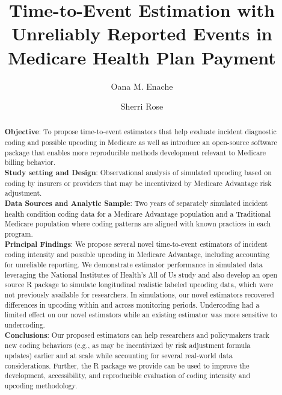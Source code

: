 \documentclass[
  12pt,
  number]{elsarticle}
\begin{document}
\begin{frontmatter}
\title{Time-to-Event Estimation with Unreliably Reported Events in
Medicare Health Plan Payment}
\author[1]{Oana M. Enache%
%
}
\author[2]{Sherri Rose%
%
}





        
\begin{abstract}
\textbf{Objective}: To propose time-to-event estimators that help
evaluate incident diagnostic coding and possible upcoding in Medicare as
well as introduce an open-source software package that enables more
reproducible methods development relevant to Medicare billing
behavior.\\
\textbf{Study setting and Design}: Observational analysis of simulated
upcoding based on coding by insurers or providers that may be
incentivized by Medicare Advantage risk adjustment.\\
\textbf{Data Sources and Analytic Sample}: Two years of separately
simulated incident health condition coding data for a Medicare Advantage
population and a Traditional Medicare population where coding patterns
are aligned with known practices in each program.\\
\textbf{Principal Findings}: We propose several novel time-to-event
estimators of incident coding intensity and possible upcoding in
Medicare Advantage, including accounting for unreliable reporting. We
demonstrate estimator performance in simulated data leveraging the
National Institutes of Health's All of Us study and also develop an open
source R package to simulate longitudinal realistic labeled upcoding
data, which were not previously available for researchers. In
simulations, our novel estimators recovered differences in upcoding
within and across monitoring periods. Undercoding had a limited effect
on our novel estimators while an existing estimator was more sensitive
to undercoding.\\
\textbf{Conclusions}: Our proposed estimators can help researchers and
policymakers track new coding behaviors (e.g., as may be incentivized by
risk adjustment formula updates) earlier and at scale while accounting
for several real-world data considerations. Further, the R package we
provide can be used to improve the development, accessibility, and
reproducible evaluation of coding intensity and upcoding methodology.
\end{abstract}






\end{frontmatter}
\end{document}
